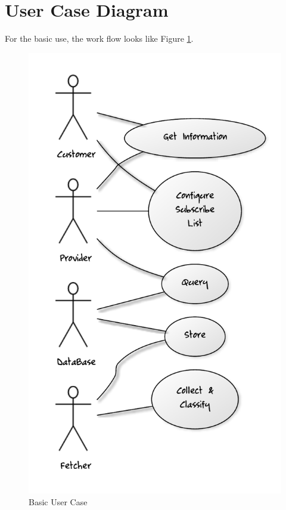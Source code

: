 \section{User Case Diagram}
  For the basic use, the work flow looks like Figure \ref{user-case-diagram}.
  \begin{figure}[htbp]
  \includegraphics[]{./figure/basic}
  \caption{Basic User Case\label{user-case-diagram}}
  \end{figure}

